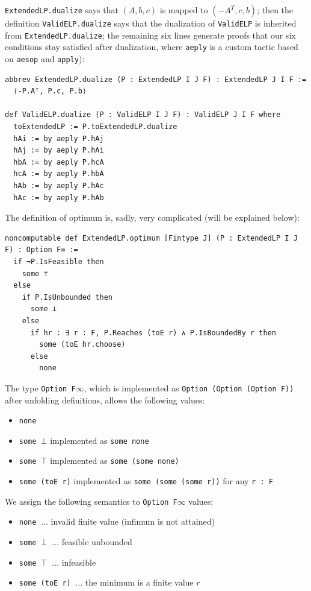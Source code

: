 \documentclass[]{article}
\renewcommand{\.}{\hskip .75pt}
\begin{document}
\texttt{ExtendedLP.dualize} says that $(A, b, c)$ is mapped to $(-A^T, c, b)$;
then the definition \texttt{ValidELP.dualize} says that the dualization of \texttt{ValidELP}
is inherited from \texttt{ExtendedLP.dualize}; the remaining six lines generate
proofs that our six conditions stay satisfied after dualization,
where \texttt{aeply} is a custom tactic based on \texttt{aesop} \cite{Aesop}
and \texttt{apply}):
\begin{lstlisting}
abbrev ExtendedLP.dualize (P : ExtendedLP I J F) : ExtendedLP J I F :=
  ⟨-P.Aᵀ, P.c, P.b⟩

def ValidELP.dualize (P : ValidELP I J F) : ValidELP J I F where
  toExtendedLP := P.toExtendedLP.dualize
  hAi := by aeply P.hAj
  hAj := by aeply P.hAi
  hbA := by aeply P.hcA
  hcA := by aeply P.hbA
  hAb := by aeply P.hAc
  hAc := by aeply P.hAb
\end{lstlisting}
The definition of optimum is, sadly, very complicated (will be explained below):
\begin{lstlisting}
noncomputable def ExtendedLP.optimum [Fintype J] (P : ExtendedLP I J F) : Option F∞ :=
  if ¬P.IsFeasible then
    some ⊤
  else
    if P.IsUnbounded then
      some ⊥
    else
      if hr : ∃ r : F, P.Reaches (toE r) ∧ P.IsBoundedBy r then
        some (toE hr.choose)
      else
        none
\end{lstlisting}
The type \texttt{Option F$\infty$}, which is implemented as
\texttt{Option (Option (Option F))} after unfolding definitions,
allows the following values:
\begin{itemize}
\item \texttt{none}
\item \texttt{some $\bot$} implemented as \texttt{some none}
\item \texttt{some $\top$} implemented as \texttt{some (some none)}
\item \texttt{some (toE r)} implemented as \texttt{some (some (some r))} for any \texttt{r :~F}
\end{itemize}
We assign the following semantics to \texttt{Option F$\infty$} values:
\begin{itemize}
\item \texttt{none} $\ \dots$ invalid finite value (infimum is not attained)
\item \texttt{some $\bot$} $\ \dots$ feasible unbounded
\item \texttt{some $\top$} $\ \dots$ infeasible
\item \texttt{some (toE r)} $\ \dots$ the minimum is a finite value $r$
\end{itemize}
\end{document}
